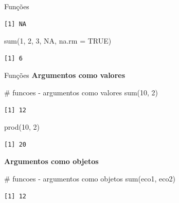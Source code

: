 \documentclass[
  ignorenonframetext,
]{beamer}
\newenvironment{Shaded}{\begin{snugshade}}{\end{snugshade}}
\newcommand{\AttributeTok}[1]{\textcolor[rgb]{0.40,0.45,0.13}{#1}}
\newcommand{\CommentTok}[1]{\textcolor[rgb]{0.37,0.37,0.37}{#1}}
\newcommand{\ConstantTok}[1]{\textcolor[rgb]{0.56,0.35,0.01}{#1}}
\newcommand{\DecValTok}[1]{\textcolor[rgb]{0.68,0.00,0.00}{#1}}
\newcommand{\FunctionTok}[1]{\textcolor[rgb]{0.28,0.35,0.67}{#1}}
\newcommand{\NormalTok}[1]{\textcolor[rgb]{0.00,0.23,0.31}{#1}}
\begin{document}
\begin{frame}[fragile]
\begin{block}{Funções}
\begin{verbatim}
[1] NA
\end{verbatim}

\begin{Shaded}
\begin{Highlighting}[]
\FunctionTok{sum}\NormalTok{(}\DecValTok{1}\NormalTok{, }\DecValTok{2}\NormalTok{, }\DecValTok{3}\NormalTok{, }\ConstantTok{NA}\NormalTok{, }\AttributeTok{na.rm =} \ConstantTok{TRUE}\NormalTok{)}
\end{Highlighting}
\end{Shaded}

\begin{verbatim}
[1] 6
\end{verbatim}
\end{block}

\begin{block}{Funções}
\protect\hypertarget{funuxe7uxf5es-3}{}
\textbf{Argumentos como valores}

\begin{Shaded}
\begin{Highlighting}[]
\CommentTok{\# funcoes {-} argumentos como valores}
\FunctionTok{sum}\NormalTok{(}\DecValTok{10}\NormalTok{, }\DecValTok{2}\NormalTok{)}
\end{Highlighting}
\end{Shaded}

\begin{verbatim}
[1] 12
\end{verbatim}

\begin{Shaded}
\begin{Highlighting}[]
\FunctionTok{prod}\NormalTok{(}\DecValTok{10}\NormalTok{, }\DecValTok{2}\NormalTok{)}
\end{Highlighting}
\end{Shaded}

\begin{verbatim}
[1] 20
\end{verbatim}

\pause

\textbf{Argumentos como objetos}

\begin{Shaded}
\begin{Highlighting}[]
\CommentTok{\# funcoes {-} argumentos como objetos}
\FunctionTok{sum}\NormalTok{(eco1, eco2)}
\end{Highlighting}
\end{Shaded}

\begin{verbatim}
[1] 12
\end{verbatim}


\end{block}
\end{frame}
\end{document}
